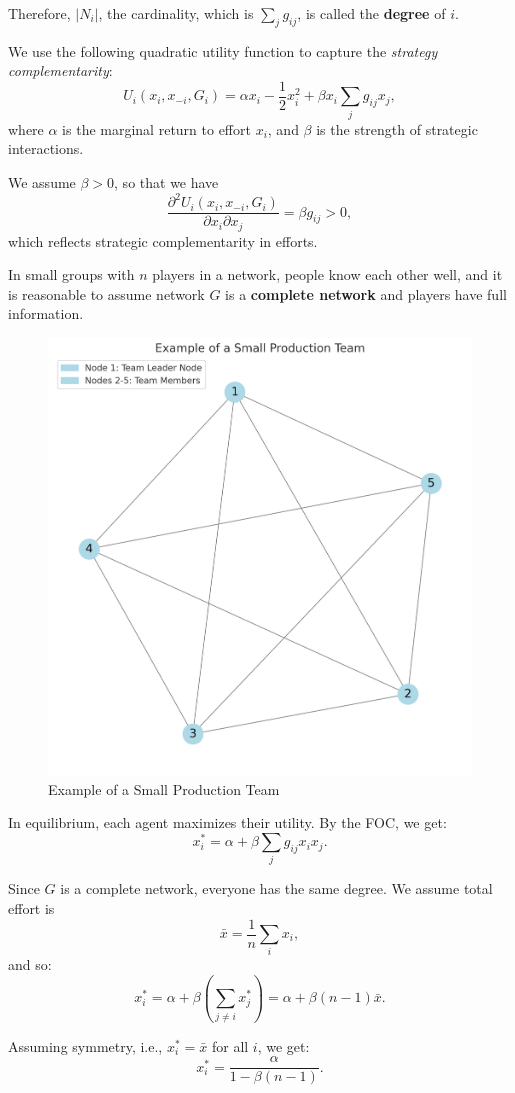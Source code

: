 \documentclass[12pt]{article}
\begin{document}
Therefore, $|N_i|$, the cardinality, which is $\sum_j g_{ij}$, is called the \textbf{degree} of $i$.

We use the following quadratic utility function to capture the \emph{strategy complementarity}:
\[
U_i(x_i, x_{-i}, G_i) = \alpha x_i - \frac{1}{2} x_i^2 + \beta x_i \sum_j g_{ij} x_j,
\]
where $\alpha$ is the marginal return to effort $x_i$, and $\beta$ is the strength of strategic interactions.

We assume $\beta > 0$, so that we have
\[
\frac{\partial^2 U_i(x_i, x_{-i}, G_i)}{\partial x_i \partial x_j} = \beta g_{ij} > 0,
\]
which reflects strategic complementarity in efforts.

In small groups with $n$ players in a network, people know each other well, and it is reasonable to assume network $G$ is a \textbf{complete network} and players have full information.

\begin{figure}[H]
  \centering
  \includegraphics[height=0.6\textwidth]{small network1.png}
  \caption{Example of a Small Production Team}
  \label{fig:small-team}
\end{figure}

In equilibrium, each agent maximizes their utility. By the FOC, we get:
\[
x_i^* = \alpha + \beta \sum_j g_{ij}x_i x_j. \tag{2}
\]

Since $G$ is a complete network, everyone has the same degree. We assume total effort is  
\[
\bar{x} = \frac{1}{n} \sum_i x_i,
\]
and so:
\[
x_i^* = \alpha + \beta \left( \sum_{j \neq i} x_j^* \right) = \alpha + \beta(n - 1)\bar{x}. \tag{3}
\]

Assuming symmetry, i.e., $x_i^* = \bar{x}$ for all $i$, we get:
\[
x_i^* = \frac{\alpha}{1 - \beta(n - 1)}.
\]
\end{document}
